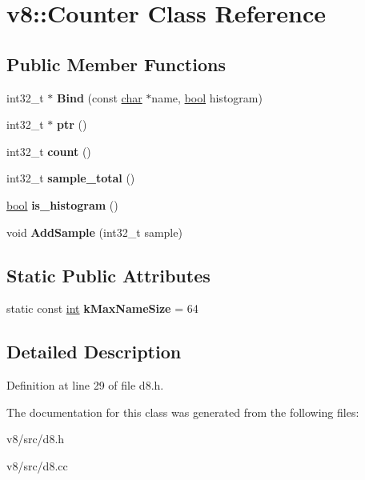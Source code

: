 \hypertarget{classv8_1_1Counter}{}\section{v8\+:\+:Counter Class Reference}
\label{classv8_1_1Counter}
\subsection*{Public Member Functions}
\begin{DoxyCompactItemize}
\item 
\mbox{\label{classv8_1_1Counter_a3d5c1db6f1a16fb30682fe0872d1850b}} 
int32\+\_\+t $\ast$ {\bfseries Bind} (const \mbox{\hyperlink{classchar}{char}} $\ast$name, \mbox{\hyperlink{classbool}{bool}} histogram)
\item 
\mbox{\label{classv8_1_1Counter_a9b621d24818a32d04673b4f3abc55603}} 
int32\+\_\+t $\ast$ {\bfseries ptr} ()
\item 
\mbox{\label{classv8_1_1Counter_abb91bdeaa89a1055f5566414d42ac7cb}} 
int32\+\_\+t {\bfseries count} ()
\item 
\mbox{\label{classv8_1_1Counter_a932e1cf3d4e1ad83ec279f14e9df3453}} 
int32\+\_\+t {\bfseries sample\+\_\+total} ()
\item 
\mbox{\label{classv8_1_1Counter_abec9d55ada4b4407b00edbc02e2ab74e}} 
\mbox{\hyperlink{classbool}{bool}} {\bfseries is\+\_\+histogram} ()
\item 
\mbox{\label{classv8_1_1Counter_ae66b172d2409a791fdcb9836037b8a1b}} 
void {\bfseries Add\+Sample} (int32\+\_\+t sample)
\end{DoxyCompactItemize}
\subsection*{Static Public Attributes}
\begin{DoxyCompactItemize}
\item 
\mbox{\label{classv8_1_1Counter_a706545f71074bdbebc9def4f07c76c85}} 
static const \mbox{\hyperlink{classint}{int}} {\bfseries k\+Max\+Name\+Size} = 64
\end{DoxyCompactItemize}


\subsection{Detailed Description}


Definition at line 29 of file d8.\+h.



The documentation for this class was generated from the following files\+:\begin{DoxyCompactItemize}
\item 
v8/src/d8.\+h\item 
v8/src/d8.\+cc\end{DoxyCompactItemize}
